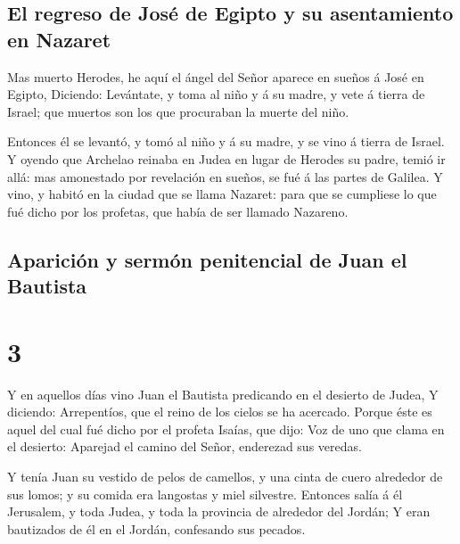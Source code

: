 \hypertarget{el-regreso-de-josuxe9-de-egipto-y-su-asentamiento-en-nazaret}{%
\subsection{El regreso de José de Egipto y su asentamiento en
Nazaret}\label{el-regreso-de-josuxe9-de-egipto-y-su-asentamiento-en-nazaret}}

 Mas muerto Herodes, he aquí el ángel del Señor aparece
en sueños á José en Egipto,  Diciendo: Levántate, y toma
al niño y á su madre, y vete á tierra de Israel; que muertos son los que
procuraban la muerte del niño.

 Entonces él se levantó, y tomó al niño y á su madre, y
se vino á tierra de Israel.  Y oyendo que Archelao
reinaba en Judea en lugar de Herodes su padre, temió ir allá: mas
amonestado por revelación en sueños, se fué á las partes de Galilea.
 Y vino, y habitó en la ciudad que se llama Nazaret: para
que se cumpliese lo que fué dicho por los profetas, que había de ser
llamado Nazareno.

\hypertarget{apariciuxf3n-y-sermuxf3n-penitencial-de-juan-el-bautista}{%
\subsection{Aparición y sermón penitencial de Juan el
Bautista}\label{apariciuxf3n-y-sermuxf3n-penitencial-de-juan-el-bautista}}

\hypertarget{section-40-3}{%
\section{3}\label{section-40-3}}

 Y en aquellos días vino Juan el Bautista predicando en el
desierto de Judea,  Y diciendo: Arrepentíos, que el reino
de los cielos se ha acercado.  Porque éste es aquel del
cual fué dicho por el profeta Isaías, que dijo: Voz de uno que clama en
el desierto: Aparejad el camino del Señor, enderezad sus veredas.

 Y tenía Juan su vestido de pelos de camellos, y una cinta
de cuero alrededor de sus lomos; y su comida era langostas y miel
silvestre.  Entonces salía á él Jerusalem, y toda Judea, y
toda la provincia de alrededor del Jordán;  Y eran
bautizados de él en el Jordán, confesando sus pecados.

